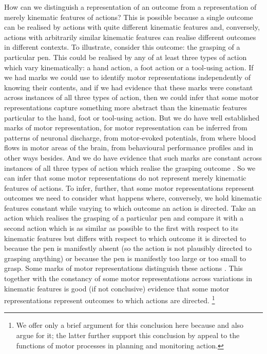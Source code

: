 \documentclass[12pt,\papersize]{extarticle}
\begin{document}
How can we distinguish a representation of an outcome from a representation of merely kinematic features of actions? This is possible because a single outcome can be realised by actions with quite different kinematic features and, conversely, actions with arbitrarily similar kinematic features can realise different outcomes in different contexts.  To illustrate, consider this outcome: the grasping of a particular pen. This could be realised by any of at least three types of action which vary kinematically: a hand action, a foot action or a tool-using action.  If we had marks we could use to identify motor representations independently of knowing their contents, and if we had evidence that these marks were constant across instances of all three types of action, then we could infer that some motor representations capture something more abstract than the kinematic features particular to the hand, foot or tool-using action. But we do have well established marks of motor representation, for motor representation can be inferred from patterns of neuronal discharge, from motor-evoked potentials, from where blood flows in motor areas of the brain, from behavioural performance profiles and in other ways besides.  And we do have evidence that such marks are constant across instances of all three types of action which realise the grasping outcome \citep{rizzolatti:1988_functional, Rizzolatti:2001ug, cattaneo:2010_state-dependent}. So we can infer that some motor representations do not represent merely kinematic features of actions. To infer, further, that some motor representations represent outcomes we need to consider what happens where, conversely, we hold kinematic features constant while varying to which outcome an action is directed. Take an action which realises the grasping of a particular pen and compare it with a second action which is as similar as possible to the first with respect to its kinematic features but differs with respect to which outcome it is directed to because the pen is manifestly absent (so the action is not plausibly directed to grasping anything) or because the pen is manifestly too large or too small to grasp.  Some marks of motor representations distinguish these actions \citep{Umilta:2001zr, villiger:2010_activity, koch:2010_resonance}.  This together with the constancy of some motor representations across variations in kinematic features is good (if not conclusive) evidence that some motor representations represent outcomes to which actions are directed.%
\footnote{
We offer only a brief argument for this conclusion here because \citet{pacherie:2008_action} and \citet{butterfill:2012_intention} also argue for it; the latter further support this conclusion by appeal to the functions of motor processes in planning and monitoring action.
}
\end{document}
